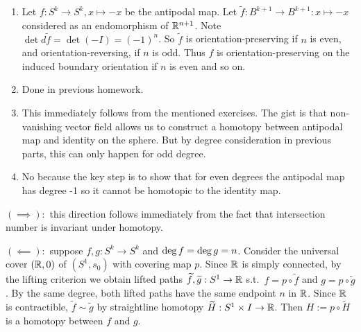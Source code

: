 \documentclass[12pt]{article}
\begin{document}
\begin{problem}[3.3.2]
\begin{enumerate}[label=(\alph*)]
	\item Let $ f:S^{k} \to S^{k}, x\mapsto -x$ be the antipodal map. Let $ \widetilde{ f}: B^{k+1} \to B^{k+1}: x \mapsto -x$ considered as an endomorphism of $ \mathbb{R}^{n+1}$. Note $ \det d\widetilde{ f} = \det (-I) =  (-1)^{n}$. So $ \widetilde{ f}$ is orientation-preserving if $ n$ is even, and orientation-reversing, if  $ n$ is odd. Thus  $ f$ is orientation-preserving on the induced boundary orientation if  $ n$ is even and so on.
	\item Done in previous homework.
	\item This immediately follows from the mentioned exercises. The gist is that non-vanishing vector field allows us to construct a homotopy between antipodal map and identity on the sphere. But by degree consideration in previous parts, this can only happen for odd degree.
	\item No because the key step is to show that for even degrees the antipodal map has degree -1 so it cannot be homotopic to the identity map.
\end{enumerate}
\end{problem}

\begin{problem}[3.3.9]
$ (\implies):$ this direction follows immediately from the fact that intersection number is invariant under homotopy.

$ (\impliedby):$ suppose $ f,g: S^{k} \to S^{k}$ and $ \deg f = \operatorname{deg} g=n$. Consider the universal cover $ (\mathbb{R},0)$ of $ (S^{1},s_0)$ with covering map $ p$. Since $ \mathbb{R}$ is simply connected, by the lifting criterion we obtain lifted paths $ \widetilde{ f}, \widetilde{ g}: S^{1} \to \mathbb{R}$ s.t.\ $ f= p \circ \widetilde{ f}$ and $ g= p \circ \widetilde{ g}$. By the same degree, both lifted paths have the same endpoint $n$ in $ \mathbb{R}$. Since $ \mathbb{R}$ is contractible, $ \widetilde{ f} \sim \widetilde{ g}$ by straightline homotopy $ \widetilde{ H}: S^{1} \times I \to \mathbb{R}$. Then $ H:= p \circ \widetilde{ H}$ is a homotopy between $ f$ and  $ g$.
\end{problem}
\end{document}
